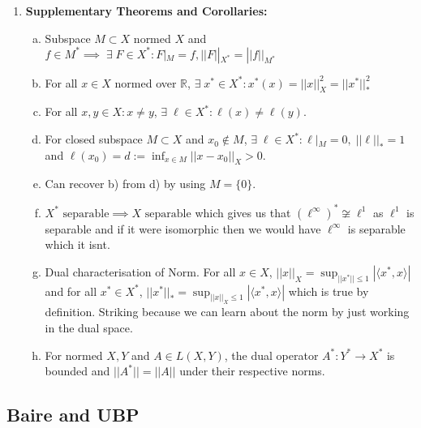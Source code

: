 \documentclass{article}
\begin{document}
\begin{enumerate}
    \item \textbf{Supplementary Theorems and Corollaries:}
    \begin{enumerate} [a.]
        \item Subspace \(M \subset X\) normed \(X\) and \(f \in M^* \implies \; \exists\; F \in X^* : F|_M = f, ||F||_{X^*} = ||f||_{M^*}\)
        \item For all \(x \in X\) normed over \(\mathbb{R}\), \(\exists\; x^* \in X^* : x^*(x) = ||x||_X^2 = ||x^*||_*^2\)
        \item For all \(x, y \in X: x\neq y\), \(\exists\; \ell \in X^*:\ell(x) \neq \ell(y)\).
        \item For closed subspace \(M \subset X\) and \(x_0 \notin M\), \(\exists \;\ell \in X^*: \ell|_M = 0, \;||\ell||_* = 1\) and \(\ell(x_0) = d:= \inf_{x\in M}||x-x_0||_X>0\).
        \item Can recover b) from d) by using \(M = \{0\}\).
        \item \(X^* \text{ separable} \implies X \text{ separable}\) which gives us that \((\ell^\infty)^* \not\cong \ell^1\) as \(\ell^1\) is separable and if it were isomorphic then we would have \(\ell^\infty\) is separable which it isnt.
        \item Dual characterisation of Norm. For all \(x \in X\), \(||x||_X = \sup_{||x^*|| \leq 1} |\langle x^*, x\rangle| \) and for all \(x^* \in X^*\), \(||x^*||_* = \sup_{||x||_X\leq 1} |\langle x^*, x\rangle|\) which is true by definition. Striking because we can learn about the norm by just working in the dual space.
        \item For normed \(X, Y\) and \(A\in L(X, Y)\), the dual operator \(A^* :Y^* \to X^*\) is bounded and \(||A^*|| = ||A||\) under their respective norms.
    \end{enumerate}
\end{enumerate}

\subsection*{Baire and UBP}
\end{document}
